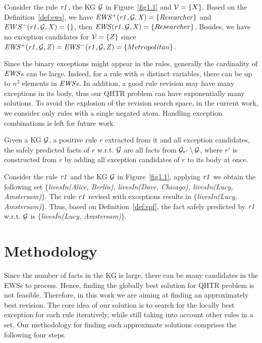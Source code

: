 \begin{example}
Consider the rule $\mathit{r1}$, the KG $\mathcal{G}$ in Figure~\ref{fig1.1} and $\mathcal{V} = \{X\}$. Based on the Definition~\ref{def:ews}, we have $\mathit{EWS^+(r1,\mathcal{G},X) = \{Researcher\}}$ and $EWS^-(\mathit{r1},\mathcal{G},X) = \{\}$, then $\mathit{EWS(r1,\mathcal{G},X)}=\{Researcher\}$. Besides, we have no exception candidates for $\mathcal{V} = \{Z\}$ since $\mathit{EWS^+(r1,\mathcal{G},Z)} = \mathit{EWS^-(r1,\mathcal{G},Z)} = \{Metropolitan\}$.
\end{example}

Since the binary exceptions might appear in the rules, generally the cardinality of $\mathit{EWS}$s can be large. Indeed, for a rule with $n$ distinct variables, there can be up to $n^2$ elements in $\mathit{EWS}$s. In addition, a good rule revision may have many exceptions in its body, thus our QHTR problem can have exponentially many solutions. To avoid the explosion of the revision search space, in the current work, we consider only rules with a single negated atom. Handling exception combinations is left for future work.

\begin{definition} \label{def:spf}
Given a KG $\mathcal{G}$, a positive rule $r$ extracted from it and all exception candidates, the safely predicted facts of $r$ w.r.t. $\mathcal{G}$ are all facts from $\mathcal{G}_{r'} \setminus \mathcal{G}$, where $r'$ is constructed from $r$ by adding all exception candidates of $r$ to its body at once.
\end{definition}

\begin{example}
Consider the rule $\mathit{r1}$ and the KG $\mathcal{G}$ in Figure~\ref{fig1.1}, applying $\mathit{r1}$ we obtain the following set \textit{$\{$livesIn(Alice, Berlin), livesIn(Dave, Chicago), livesIn(Lucy, Amstersam)$\}$}. The rule $\mathit{r1}$ revised with exceptions results in \textit{$\{$livesIn(Lucy, Amstersam)$\}$}. Thus, based on Definition~\ref{def:spf}, the fact safely predicted by $\mathit{r1}$ w.r.t. $\mathcal{G}$ is \textit{$\{$livesIn(Lucy, Amstersam)$\}$}.
\end{example}

\section{Methodology}\label{sec:meth}

Since the number of facts in the KG is large, there can be many candidates in the EWSs to process. Hence, finding the globally best solution for QHTR problem is not feasible. Therefore, in this work we are aiming at finding an approximately best revision. The core idea of our solution is to search for the locally best exception for each rule iteratively, while still taking into account other rules in a set. Our methodology for finding such approximate solutions comprises the following four steps.
\medskip

